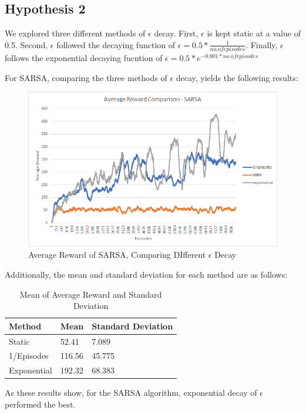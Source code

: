 \subsection{Hypothesis 2}

We explored three different methods of $\epsilon$ decay. First, $\epsilon$ is kept static at a value of 0.5. Second, 
$\epsilon$ followed the decaying function of $\epsilon = 0.5 * \frac{1}{no. of episodes}$. Finally,
$\epsilon$ follows the exponential decaying fucntion of $\epsilon = 0.5 * e^{-0.001*no. of episodes}$

For SARSA, comparing the three methods of $\epsilon$ decay, yields the following results:

\begin{figure}[H] %
    \centering
    \includegraphics[width=0.75\linewidth]{epsilon-decay-comparison.png}
    \caption{Average Reward of SARSA, Comparing DIfferent $\epsilon$ Decay}
\end{figure}

Additionally, the mean and standard deviation for each method are as follows:

\begin{table}[H]
    \begin{tabular}{lll}
    \hline
    Method      & Mean   & Standard Deviation \\ \hline
    Static      & 52.41  & 7.089              \\
    1/Episodes  & 116.56  & 45.775             \\
    Exponential & 192.32 & 68.383             \\ \hline
    \end{tabular}
    \caption{Mean of Average Reward and Standard Deviation}
\end{table}

As these results show, for the SARSA algorithm, exponential decay of $\epsilon$ performed the best.

